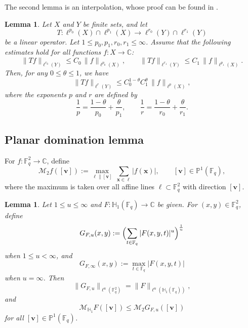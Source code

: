 \documentclass[11pt]{article}
\newtheorem{lemma}[theorem]{Lemma}
\newcommand{\1}{\mathbf 1}
\newcommand{\Fq}{\mathbb{F}_q}
\begin{document}
The second lemma is an interpolation, whose proof can be found in \cite{Grafakos04}.

\begin{lemma}\label{interpolation-inequality}
Let $X$ and $Y$ be finite sets, and let
\[
T : \ell^{p_0}(X) \cap \ell^{p_1}(X)\longrightarrow \ell^{r_0}(Y) \cap \ell^{r_1}(Y)
\]
be a linear operator.
Let $1 \le p_0, p_1, r_0, r_1 \le \infty$.
Assume that the following estimates hold for all functions $f : X \to \mathbb{C}$:
\[
\|Tf\|_{\ell^{r_0}(Y)} \le C_0 \, \|f\|_{\ell^{p_0}(X)},
\qquad
\|Tf\|_{\ell^{r_1}(Y)} \le C_1 \, \|f\|_{\ell^{p_1}(X)}.
\]
Then, for any $0 \le \theta \le 1$, we have
\[
\|Tf\|_{\ell^{r}(Y)} \le C_0^{1-\theta} C_1^{\theta} \, \|f\|_{\ell^{p}(X)},
\]
where the exponents $p$ and $r$ are defined by
\[
\frac{1}{p} = \frac{1-\theta}{p_0} + \frac{\theta}{p_1},
\qquad
\frac{1}{r} = \frac{1-\theta}{r_0} + \frac{\theta}{r_1}.
\]
\end{lemma}




\subsection{Planar domination lemma}

For $f:\mathbb{F}_q^2\to\mathbb{C}$, define
\begin{equation}\label{eq:Mpl}
\mathcal{M}_{2}f([\mathbf{v}])
:=
\max_{\ell\parallel [\mathbf{v}]}\ \sum_{\mathbf x\in\ell} |f(\mathbf x)|,
\qquad [\mathbf{v}]\in \mathbb{P}^{1}(\mathbb{F}_q),
\end{equation}
where the maximum is taken over all affine lines $\ell\subset \mathbb{F}_q^2$ with direction $[\mathbf{v}]$. 



\begin{lemma}
\label{lem:planar-domination}
Let $1\le u\leq \infty$ and 
$F:\mathbb{H}_1(\mathbb{F}_q)\to\mathbb{C}$ be given. For $(x,y)\in \Fq^2$, define
\[
G_{F,u}(x,y):=\Bigl(\sum_{t\in\mathbb{F}_q}|F(x,y,t)|^u\Bigr)^{\frac{1}{u}}
\]
when $1\leq u<\infty$, and 
\[
G_{F,\infty}(x,y):=\max\limits_{t\in\mathbb{F}_q}|F(x,y,t)|
\]
when $u=\infty$. Then
\begin{equation}\label{eq:Gu-norm}
\|G_{F,u}\|_{\ell^u(\mathbb{F}_q^2)}= \|F\|_{\ell^u(\mathbb{H}_1(\mathbb{F}_q))},
\end{equation}
and
\begin{equation}\label{eq:MH-by-Mpl}
\mathcal{M}_{\mathbb{H}_1} F([\mathbf{v}]) \le \mathcal{M}_{2}G_{F,u}([\mathbf{v}])
\end{equation}
for all $[\mathbf{v}]\in\mathbb{P}^1(\mathbb{F}_q)$. 
\end{lemma}
\end{document}

